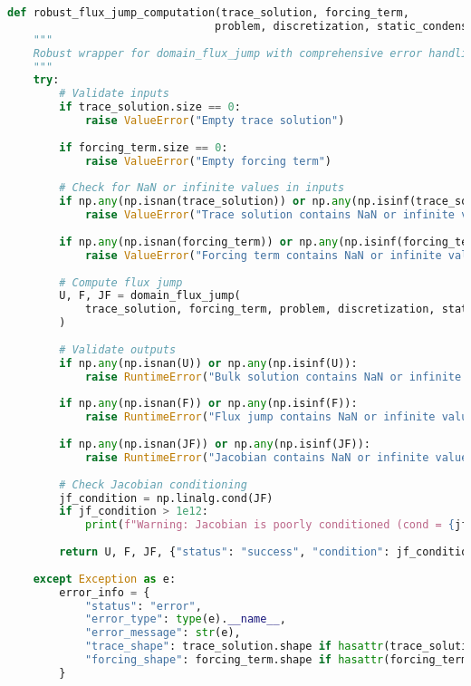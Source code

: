 \begin{lstlisting}[language=Python, caption=Error Handling Example]
def robust_flux_jump_computation(trace_solution, forcing_term, 
                                problem, discretization, static_condensation):
    """
    Robust wrapper for domain_flux_jump with comprehensive error handling.
    """
    try:
        # Validate inputs
        if trace_solution.size == 0:
            raise ValueError("Empty trace solution")
        
        if forcing_term.size == 0:
            raise ValueError("Empty forcing term")
        
        # Check for NaN or infinite values in inputs
        if np.any(np.isnan(trace_solution)) or np.any(np.isinf(trace_solution)):
            raise ValueError("Trace solution contains NaN or infinite values")
        
        if np.any(np.isnan(forcing_term)) or np.any(np.isinf(forcing_term)):
            raise ValueError("Forcing term contains NaN or infinite values")
        
        # Compute flux jump
        U, F, JF = domain_flux_jump(
            trace_solution, forcing_term, problem, discretization, static_condensation
        )
        
        # Validate outputs
        if np.any(np.isnan(U)) or np.any(np.isinf(U)):
            raise RuntimeError("Bulk solution contains NaN or infinite values")
        
        if np.any(np.isnan(F)) or np.any(np.isinf(F)):
            raise RuntimeError("Flux jump contains NaN or infinite values")
        
        if np.any(np.isnan(JF)) or np.any(np.isinf(JF)):
            raise RuntimeError("Jacobian contains NaN or infinite values")
        
        # Check Jacobian conditioning
        jf_condition = np.linalg.cond(JF)
        if jf_condition > 1e12:
            print(f"Warning: Jacobian is poorly conditioned (cond = {jf_condition:.2e})")
        
        return U, F, JF, {"status": "success", "condition": jf_condition}
        
    except Exception as e:
        error_info = {
            "status": "error",
            "error_type": type(e).__name__,
            "error_message": str(e),
            "trace_shape": trace_solution.shape if hasattr(trace_solution, 'shape') else None,
            "forcing_shape": forcing_term.shape if hasattr(forcing_term, 'shape') else None
        }
        

\end{lstlisting}
